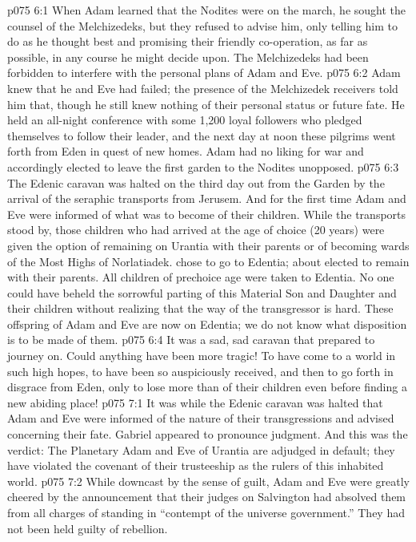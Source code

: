 \vs p075 6:1 When Adam learned that the Nodites were on the march, he sought the counsel of the Melchizedeks, but they refused to advise him, only telling him to do as he thought best and promising their friendly co\hyp{}operation, as far as possible, in any course he might decide upon. The Melchizedeks had been forbidden to interfere with the personal plans of Adam and Eve.
\vs p075 6:2 Adam knew that he and Eve had failed; the presence of the Melchizedek receivers told him that, though he still knew nothing of their personal status or future fate. He held an all\hyp{}night conference with some 1,200 loyal followers who pledged themselves to follow their leader, and the next day at noon these pilgrims went forth from Eden in quest of new homes. Adam had no liking for war and accordingly elected to leave the first garden to the Nodites unopposed.
\vs p075 6:3 The Edenic caravan was halted on the third day out from the Garden by the arrival of the seraphic transports from Jerusem. And for the first time Adam and Eve were informed of what was to become of their children. While the transports stood by, those children who had arrived at the age of choice (20 years) were given the option of remaining on Urantia with their parents or of becoming wards of the Most Highs of Norlatiadek.  chose to go to Edentia; about  elected to remain with their parents. All children of prechoice age were taken to Edentia. No one could have beheld the sorrowful parting of this Material Son and Daughter and their children without realizing that the way of the transgressor is hard. These offspring of Adam and Eve are now on Edentia; we do not know what disposition is to be made of them.
\vs p075 6:4 It was a sad, sad caravan that prepared to journey on. Could anything have been more tragic! To have come to a world in such high hopes, to have been so auspiciously received, and then to go forth in disgrace from Eden, only to lose more than  of their children even before finding a new abiding place!
\vs p075 7:1 It was while the Edenic caravan was halted that Adam and Eve were informed of the nature of their transgressions and advised concerning their fate. Gabriel appeared to pronounce judgment. And this was the verdict: The Planetary Adam and Eve of Urantia are adjudged in default; they have violated the covenant of their trusteeship as the rulers of this inhabited world.
\vs p075 7:2 While downcast by the sense of guilt, Adam and Eve were greatly cheered by the announcement that their judges on Salvington had absolved them from all charges of standing in “contempt of the universe government.” They had not been held guilty of rebellion.
